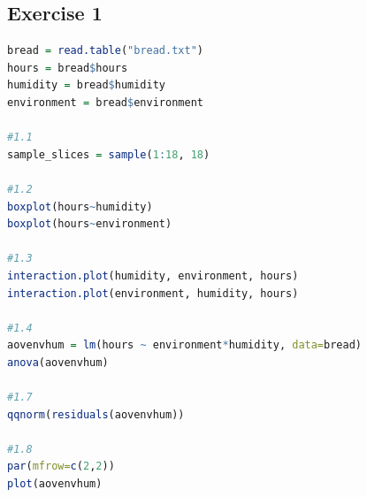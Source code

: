 \documentclass{article}
\begin{document}
    \subsection{Exercise 1}\label{sec:RE1}
      \begin{lstlisting}[language=R]
bread = read.table("bread.txt")
hours = bread$hours
humidity = bread$humidity
environment = bread$environment

#1.1
sample_slices = sample(1:18, 18)

#1.2
boxplot(hours~humidity)
boxplot(hours~environment)

#1.3
interaction.plot(humidity, environment, hours)
interaction.plot(environment, humidity, hours)

#1.4
aovenvhum = lm(hours ~ environment*humidity, data=bread)
anova(aovenvhum)

#1.7
qqnorm(residuals(aovenvhum))

#1.8
par(mfrow=c(2,2))
plot(aovenvhum)

      \end{lstlisting}
\end{document}
